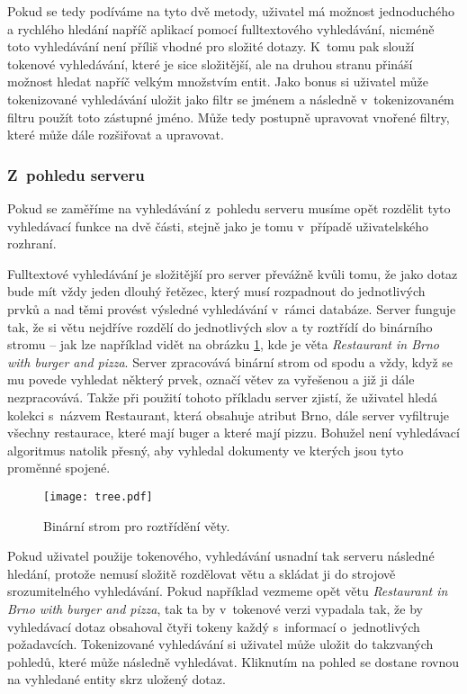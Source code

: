 \par Pokud se tedy podíváme na tyto dvě metody, uživatel má možnost jednoduchého a rychlého hledání napříč aplikací pomocí fulltextového vyhledávání, nicméně toto vyhledávání není příliš vhodné pro složité dotazy. K~tomu pak slouží tokenové vyhledávání, které je sice složitější, ale na druhou stranu přináší možnost hledat napříč velkým množstvím entit. Jako bonus si uživatel může tokenizované vyhledávání uložit jako filtr se jménem a následně v~tokenizovaném filtru použít toto zástupné jméno. Může tedy postupně upravovat vnořené filtry, které může dále rozšiřovat a upravovat.

\subsubsection{Z~pohledu serveru}
\par Pokud se zaměříme na vyhledávání z~pohledu serveru musíme opět rozdělit tyto vyhledávací funkce na dvě části, stejně jako je tomu v~případě uživatelského rozhraní.

\par Fulltextové vyhledávání je složitější pro server převážně kvůli tomu, že jako dotaz bude mít vždy jeden dlouhý řetězec, který musí rozpadnout do jednotlivých prvků a nad těmi provést výsledné vyhledávání v~rámci databáze. Server funguje tak, že si větu nejdříve rozdělí do jednotlivých slov a ty roztřídí do binárního stromu -- jak lze například vidět na obrázku \ref{binarni-strom}, kde je věta \textit{Restaurant in Brno with burger and pizza}. Server zpracovává binární strom od spodu a vždy, když se mu povede vyhledat některý prvek, označí větev za vyřešenou a již ji dále nezpracovává. Takže při použití tohoto příkladu server zjistí, že uživatel hledá kolekci s~názvem Restaurant, která obsahuje atribut Brno, dále server vyfiltruje všechny restaurace, které mají buger a které mají pizzu. Bohužel není vyhledávací algoritmus natolik přesný, aby vyhledal dokumenty ve kterých jsou tyto proměnné spojené.

\begin{figure}[!htb]
\centering
\texttt{[image: tree.pdf]}
\caption{Binární strom pro roztřídění věty.}
\label{binarni-strom}
\end{figure}

\par Pokud uživatel použije tokenového, vyhledávání usnadní tak serveru následné hledání, protože nemusí složitě rozdělovat větu a skládat ji do strojově srozumitelného vyhledávání. Pokud například vezmeme opět větu \textit{Restaurant in Brno with burger and pizza}, tak ta by v~tokenové verzi vypadala tak, že by vyhledávací dotaz obsahoval čtyři tokeny každý s~informací o~jednotlivých požadavcích. Tokenizované vyhledávání si uživatel může uložit do takzvaných pohledů, které může následně vyhledávat. Kliknutím na pohled se dostane rovnou na vyhledané entity skrz uložený dotaz.
\newpage
